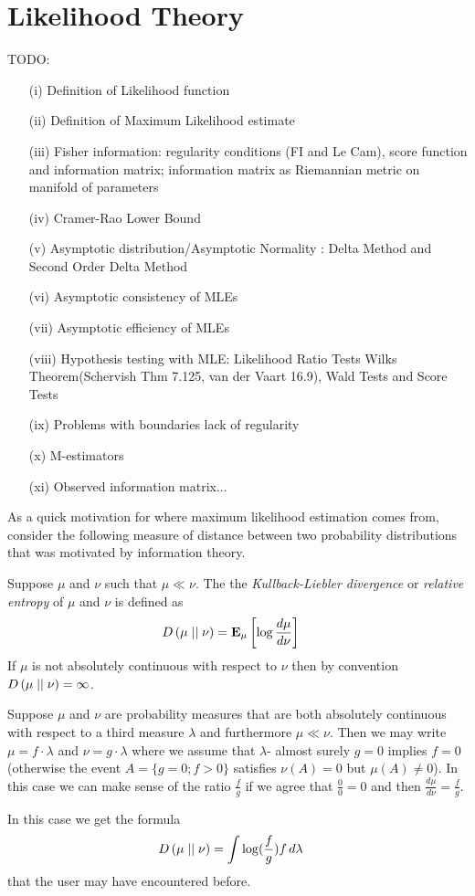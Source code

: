 \chapter{Likelihood Theory}
TODO:
\begin{itemize}
\item[(i)] Definition of Likelihood function
\item[(ii)] Definition of Maximum Likelihood estimate
\item[(iii)] Fisher information: regularity conditions (FI and Le Cam), score function
  and information matrix; information matrix as Riemannian metric on
  manifold of parameters
\item[(iv)] Cramer-Rao Lower Bound
\item[(v)] Asymptotic distribution/Asymptotic Normality : Delta Method and Second Order Delta Method
\item[(vi)] Asymptotic consistency of MLEs 
\item[(vii)] Asymptotic efficiency of MLEs
\item[(viii)] Hypothesis testing with MLE: Likelihood Ratio Tests 
  Wilks Theorem(Schervish Thm 7.125, van der Vaart 16.9), Wald Tests and Score Tests
\item[(ix)] Problems with boundaries lack of regularity
\item[(x)] M-estimators
\item[(xi)]Observed information matrix...
\end{itemize}

As a quick motivation for where maximum likelihood estimation comes
from, consider the following measure of distance between two
probability distributions that was motivated by information theory.
\begin{defn}Suppose $\mu$ and $\nu$ such that $\mu \ll \nu$.  The the \emph{Kullback-Liebler divergence} or \emph{relative
    entropy} of $\mu$ and $\nu$ is defined as
\begin{align*}
D\left( \mu \mid\mid \nu \right) &= \textbf{E}_{\mu}\left [\log \frac{d\mu}{d\nu} \right]
\end{align*}
If $\mu$ is not absolutely continuous with respect to $\nu$ then by
convention $D\left( \mu \mid\mid \nu \right) = \infty$.
\end{defn}

\begin{examp}
Suppose $\mu$ and $\nu$ are probability measures that are both
absolutely continuous with respect to a third measure $\lambda$ and
furthermore $\mu \ll \nu$.  Then we may write $\mu = f \cdot \lambda$
and $\nu = g \cdot \lambda$ where we assume that $\lambda$- almost
surely $g=0$ implies $f=0$ (otherwise the event $A=\lbrace g=0; f>0 \rbrace$
satisfies $\nu(A)=0$ but $\mu(A)\neq 0$).  In this case we can make sense of the
ratio $\frac{f}{g}$ if we agree that $\frac{0}{0} = 0$ and then $\frac{d\mu}{d\nu} = \frac{f}{g}$.

In this case we get the formula 
\begin{align*}
D\left( \mu \mid\mid \nu \right) &= \int \log(\frac{f}{g}) f \, d\lambda
\end{align*}
that the user may have encountered before.
\end{examp}

